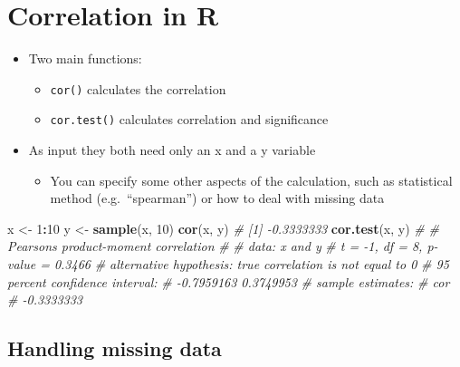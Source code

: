 \documentclass[
]{book}
\newenvironment{Shaded}{\begin{snugshade}}{\end{snugshade}}
\newcommand{\CommentTok}[1]{\textcolor[rgb]{0.56,0.35,0.01}{\textit{#1}}}
\newcommand{\DecValTok}[1]{\textcolor[rgb]{0.00,0.00,0.81}{#1}}
\newcommand{\FunctionTok}[1]{\textcolor[rgb]{0.13,0.29,0.53}{\textbf{#1}}}
\newcommand{\NormalTok}[1]{#1}
\newcommand{\OtherTok}[1]{\textcolor[rgb]{0.56,0.35,0.01}{#1}}
\newcommand{\SpecialCharTok}[1]{\textcolor[rgb]{0.81,0.36,0.00}{\textbf{#1}}}
\providecommand{\tightlist}{%
  \setlength{\itemsep}{0pt}\setlength{\parskip}{0pt}}
\begin{document}
\section{Correlation in R}\label{correlation-in-r}

\begin{itemize}
\tightlist
\item
  Two main functions:

  \begin{itemize}
  \tightlist
  \item
    \texttt{cor()} calculates the correlation
  \item
    \texttt{cor.test()} calculates correlation and significance
  \end{itemize}
\item
  As input they both need only an x and a y variable

  \begin{itemize}
  \tightlist
  \item
    You can specify some other aspects of the calculation, such as statistical method (e.g.~``spearman'') or how to deal with missing data
  \end{itemize}
\end{itemize}

\begin{Shaded}
\begin{Highlighting}[]
\NormalTok{x }\OtherTok{\textless{}{-}} \DecValTok{1}\SpecialCharTok{:}\DecValTok{10} 
\NormalTok{y }\OtherTok{\textless{}{-}} \FunctionTok{sample}\NormalTok{(x, }\DecValTok{10}\NormalTok{)}
\FunctionTok{cor}\NormalTok{(x, y)}
\CommentTok{\# [1] {-}0.3333333}
\FunctionTok{cor.test}\NormalTok{(x, y)}
\CommentTok{\# }
\CommentTok{\#   Pearson\textquotesingle{}s product{-}moment correlation}
\CommentTok{\# }
\CommentTok{\# data:  x and y}
\CommentTok{\# t = {-}1, df = 8, p{-}value = 0.3466}
\CommentTok{\# alternative hypothesis: true correlation is not equal to 0}
\CommentTok{\# 95 percent confidence interval:}
\CommentTok{\#  {-}0.7959163  0.3749953}
\CommentTok{\# sample estimates:}
\CommentTok{\#        cor }
\CommentTok{\# {-}0.3333333}
\end{Highlighting}
\end{Shaded}

\subsection{Handling missing data}\label{handling-missing-data}
\end{document}
